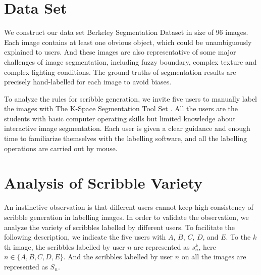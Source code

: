 \documentclass[runningheads,a4paper]{llncs}
\begin{document}
\section{Data Set}
We construct our data set Berkeley Segmentation Dataset \cite{martin2001database} in size of 96 images. Each image contains at least one obvious object, which could be unambiguously explained to users. And these images are also representative of some major challenges of image segmentation, including fuzzy boundary, complex texture and complex lighting conditions. The ground truths of segmentation results are precisely hand-labelled for each image to avoid biases.

To analyze the rules for scribble generation, we invite five users to manually label the images with The K-Space Segmentation Tool Set \cite{mcguinness2008k}. All the users are the students with basic computer operating skills but limited knowledge about interactive image segmentation. Each user is given a clear guidance and enough time to familiarize themselves with the labelling software, and all the labelling operations are carried out by mouse.


\section{Analysis of Scribble Variety}

An instinctive observation is that different users cannot keep high consistency of scribble generation in labelling images. In order to validate the observation, we analyze the variety of scribbles labelled by different users. To facilitate the following description, we indicate the five users with $A$, $B$, $C$, $D$, and $E$. To the $k$th image, the scribbles labelled by user $n$ are represented as $s^{k}_{n}$, here $n\in \{A,B,C,D,E\}$. And the scribbles labelled by user $n$ on all the images are represented as $S_{n}$.
\end{document}
